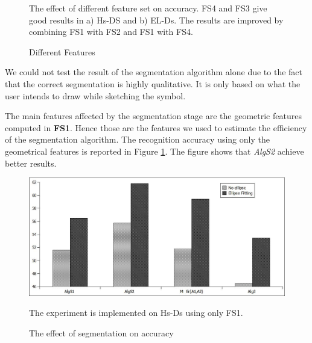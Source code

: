\documentclass[preprint,10pt,5p,twocolumn]{elsarticle}
\begin{document}
 \begin{figure}
	\centering
	\caption{Different Features} The effect of different feature set on accuracy.  FS4 and FS3 give good results in a) Hs-DS and b) EL-Ds. The results are improved by combining FS1 with FS2 and FS1 with FS4.    %
\end{figure}  

 We could not test the result of the segmentation algorithm alone due to the fact that the correct segmentation is highly qualitative. It is only based on what the user intends to draw while sketching the symbol. 
 
 The main features affected by the segmentation stage are the geometric features computed in \textbf{FS1}. Hence those are the features we used to estimate the efficiency of the segmentation algorithm. The recognition accuracy using only the geometrical features is reported in Figure \ref{fig:testFeatonly}. The figure shows that \textsl{AlgS2} achieve better results.  
\begin{figure} 
	\centering
		\includegraphics[scale=0.3]{images/OnlyF1EL.jpg}
	\caption{The effect of segmentation on accuracy} The experiment is implemented on Hs-Ds using only FS1.  %
	\label{fig:testFeatonly}
\end{figure}  
\end{document}
